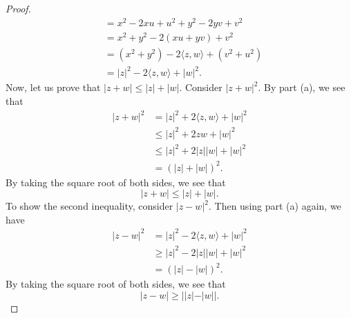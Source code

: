 \documentclass[a4paper]{article}
\begin{document}
\begin{enumerate}
\begin{enumerate}
\begin{proof}
\begin{align*}
                                                           &=  x^{2} -2xu + u^{2} + y^{2} -2yv + v^{2} \\
                                                           &= x^{2} + y^{2} -2(xu + yv) + v^{2} \\
                                                           &= (x^{2}  + y^{2}) -2 \langle z , w \rangle + (v^{2} + u^{2}) \\ 
                                                           &= | z |^{2} - 2 \langle z , w \rangle + | w |^{2}.
\end{align*}
Now, let us prove that \( | z + w  | \leq | z  |  + | w |  \). Consider \( | z + w  |^{2} \). By part (a), we see that
\begin{align*}
    | z + w  |^{2} &= | z  |^{2} + 2 \langle z , w \rangle + | w |^{2} \\
                   &\leq | z |^{2} + 2 z  w + | w |^{2} \\ 
                   &\leq | z |^{2} + 2 | z | | w |  + | w |^{2} \\
                   &= (| z |  + | w | )^{2}.
\end{align*}
By taking the square root of both sides, we see that
\[  | z + w  | \leq | z  |  + | w |. \]
To show the second inequality, consider \( | z - w  |^{2} \). Then using part (a) again, we have
\begin{align*}
    | z - w  |^{2} &= | z |^{2} - 2 \langle z , w \rangle + | w  |^{2} \\
                   & \geq | z |^{2} - 2 | z | | w |  + | w |^{2} \\ 
                   &= (| z |  - | w |)^{2}. 
\end{align*}
By taking the square root of both sides, we see that 
\[  | z - w  | \geq |  | z  |  - | w |  |.  \]




\end{proof}
\end{enumerate}
\end{enumerate}
\end{document}
